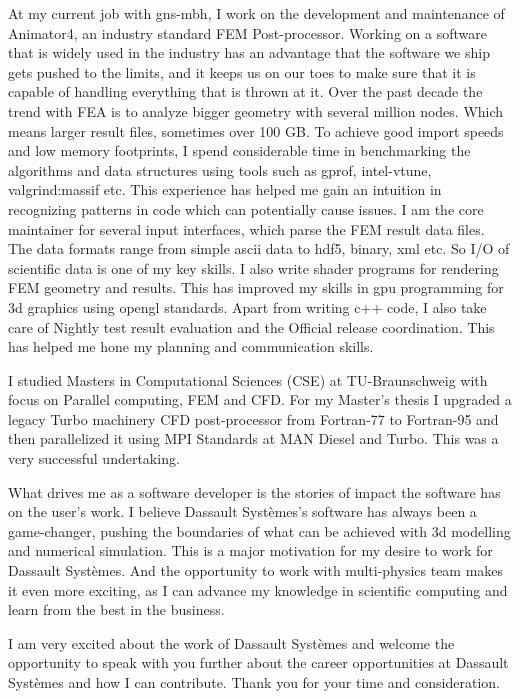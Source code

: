 \documentclass[11pt, a4paper]{awesome-cv}
\newcommand{\company}{Dassault Syst\`emes}
\begin{document}
\begin{cvletter}
At my current job with gns-mbh, I work on the development and maintenance of 
Animator4, an industry standard FEM Post-processor. 
Working on a software that is widely used in the industry has an advantage that 
the software we ship gets pushed to the limits, and it keeps us on our toes to 
make sure that it is capable of handling everything that is thrown at it. 
Over the past decade the trend with FEA is to analyze bigger geometry 
with several million nodes. Which means larger result files, sometimes over 100 
GB. To achieve good import speeds and low memory footprints, I spend 
considerable time in benchmarking the algorithms and data structures using tools
 such as gprof, intel-vtune, valgrind:massif etc.
This experience has helped me gain an intuition in recognizing patterns in code
which can potentially cause issues.   
I am the core maintainer for several input interfaces, which parse the FEM 
result data files. The data formats range from simple ascii data to hdf5, binary, 
xml etc. So I/O of scientific data is one of my key skills. 
I also write shader programs for rendering FEM geometry and results. This has 
improved my skills in gpu programming for 3d graphics using opengl standards.
Apart from writing c++ code, I also take care of Nightly test result evaluation
and the Official release coordination. This has helped me hone my planning and 
communication skills.

I studied Masters in Computational Sciences (CSE) at TU-Braunschweig with focus 
on Parallel computing, FEM and CFD. For my Master's thesis I upgraded a legacy 
Turbo machinery CFD post-processor from Fortran-77 to Fortran-95 and then 
parallelized it using MPI Standards at MAN Diesel and Turbo. This was a very 
successful undertaking.     

What drives me as a software developer is the stories of impact the software has
 on the user's work. I believe \company{}'s software has always been a 
 game-changer, pushing the boundaries of what can be achieved with 3d modelling 
and numerical simulation. This is a major motivation for my desire to work for 
\company{}. And the opportunity to work with multi-physics team makes it even 
more exciting, as I can advance my knowledge in scientific computing and learn
from the best in the business. 


I am very excited about the work of \company{} and welcome the opportunity to 
speak with you further about the career opportunities at \company{} and how I 
can contribute. Thank you for your time and consideration. 

 
\end{cvletter}


\makeletterclosing
\end{document}
